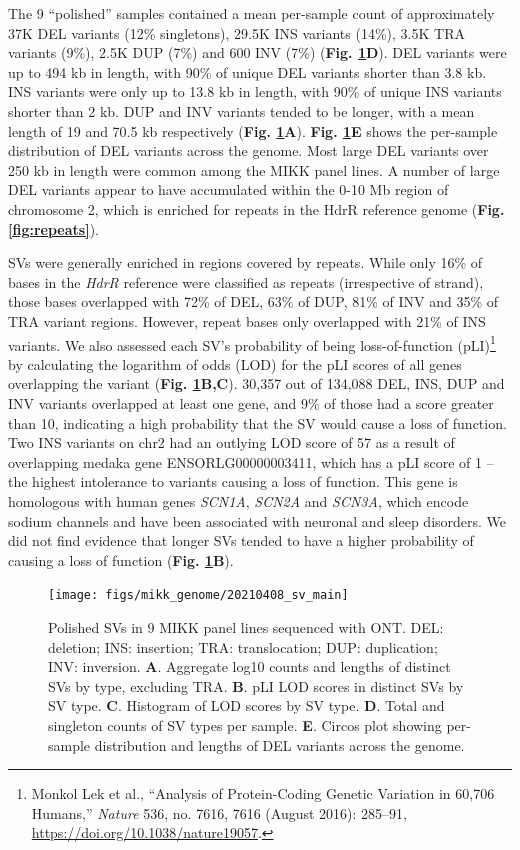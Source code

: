 \documentclass[
]{book}
\begin{document}
The 9 ``polished'' samples contained a mean per-sample count of approximately 37K DEL variants (12\% singletons), 29.5K INS variants (14\%), 3.5K TRA variants (9\%), 2.5K DUP (7\%) and 600 INV (7\%) (\textbf{Fig. \ref{fig:SV-main}D}). DEL variants were up to 494 kb in length, with 90\% of unique DEL variants shorter than 3.8 kb. INS variants were only up to 13.8 kb in length, with 90\% of unique INS variants shorter than 2 kb. DUP and INV variants tended to be longer, with a mean length of 19 and 70.5 kb respectively (\textbf{Fig. \ref{fig:SV-main}A}). \textbf{Fig. \ref{fig:SV-main}E} shows the per-sample distribution of DEL variants across the genome. Most large DEL variants over 250 kb in length were common among the MIKK panel lines. A number of large DEL variants appear to have accumulated within the 0-10 Mb region of chromosome 2, which is enriched for repeats in the HdrR reference genome (\textbf{Fig. \ref{fig:repeats}}).

SVs were generally enriched in regions covered by repeats. While only 16\% of bases in the \emph{HdrR} reference were classified as repeats (irrespective of strand), those bases overlapped with 72\% of DEL, 63\% of DUP, 81\% of INV and 35\% of TRA variant regions. However, repeat bases only overlapped with 21\% of INS variants. We also assessed each SV's probability of being loss-of-function (pLI)\footnote{Monkol Lek et al., {``Analysis of Protein-Coding Genetic Variation in 60,706 Humans,''} \emph{Nature} 536, no. 7616, 7616 (August 2016): 285--91, \url{https://doi.org/10.1038/nature19057}.} by calculating the logarithm of odds (LOD) for the pLI scores of all genes overlapping the variant (\textbf{Fig. \ref{fig:SV-main}B,C}). 30,357 out of 134,088 DEL, INS, DUP and INV variants overlapped at least one gene, and 9\% of those had a score greater than 10, indicating a high probability that the SV would cause a loss of function. Two INS variants on chr2 had an outlying LOD score of 57 as a result of overlapping medaka gene ENSORLG00000003411, which has a pLI score of 1 -- the highest intolerance to variants causing a loss of function. This gene is homologous with human genes \emph{SCN1A}, \emph{SCN2A} and \emph{SCN3A}, which encode sodium channels and have been associated with neuronal and sleep disorders. We did not find evidence that longer SVs tended to have a higher probability of causing a loss of function (\textbf{Fig. \ref{fig:SV-main}B}).



\begin{figure}
\texttt{[image: figs/mikk\_genome/20210408\_sv\_main]} \caption{Polished SVs in 9 MIKK panel lines sequenced with ONT. DEL: deletion; INS: insertion; TRA: translocation; DUP: duplication; INV: inversion. \textbf{A}. Aggregate log10 counts and lengths of distinct SVs by type, excluding TRA. \textbf{B}. pLI LOD scores in distinct SVs by SV type. \textbf{C}. Histogram of LOD scores by SV type. \textbf{D}. Total and singleton counts of SV types per sample. \textbf{E}. Circos plot showing per-sample distribution and lengths of DEL variants across the genome.}\label{fig:SV-main}
\end{figure}
\end{document}
